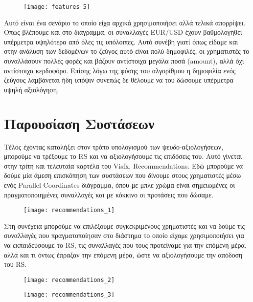 \begin{figure}[H]
  \centering
  \texttt{[image: features\_5]}
  \label{fig:features_5}
\end{figure}

Αυτό είναι ένα σενάριο το οποίο είχα αρχικά χρησιμοποιήσει αλλά τελικά απορρίψει. Όπως βλέπουμε και στο διάγραμμα, οι συναλλαγές EUR/USD έχουν βαθμολογηθεί υπέρμετρα υψηλότερα από όλες τις υπόλοιπες. Αυτό συνέβη γιατί όπως είδαμε και στην ανάλυση των δεδομένων το ζεύγος αυτό είναι πολύ δημοφιλές, οι χρηματιστές το συναλλάσουν πολλές φορές και βάζουν αντίστοιχα μεγάλα ποσά (amount), αλλά όχι αντίστοιχα κερδοφόρο. Επίσης λόγω της φύσης του αλγορίθμου η δημοφιλία ενός ζεύγους λαμβάνεται ήδη υπόψιν συνεπώς δε θέλουμε να του δώσουμε υπέρμετρα υψηλή αξιολόγηση.

\section{Παρουσίαση Συστάσεων}

Τέλος έχοντας καταλήξει στον τρόπο υπολογισμού των ψευδο-αξιολογήσεων, μπορούμε να τρέξουμε το RS και να αξιολογήσουμε τις επιδόσεις του. Αυτό γίνεται στην τρίτη και τελευταία καρτέλα του Visfx, Recommendations. Εδώ μπορούμε να δούμε μία άμεση επισκόπηση των συστάσεων που δίνουμε στους χρηματιστές μέσω ενός Parallel Coordinates διάγραμμα, όπου με μπλε χρώμα είναι σημειωμένες οι πραγματοποιημένες συναλλαγές και με κόκκινο οι προτάσεις που δώσαμε. 

\begin{figure}[H]
  \centering
  \texttt{[image: recommendations\_1]}
  \label{fig:recommendations_1}
\end{figure}

Στη συνέχεια μπορούμε να επιλέξουμε συγκεκριμένους χρηματιστές και να δούμε τις συναλλαγές που πραγματοποίησαν στο διάστημα το οποίο είχαμε χρησιμοποιήσει για να εκπαιδεύσουμε το RS, τις συναλλαγές που τους προτείναμε για την επόμενη μέρα, αλλά και τι όντως έπραξαν την επόμενη μέρα, ώστε να αξιολογήσουμε την απόδοση του RS.

\begin{figure}[H]
  \centering
  \texttt{[image: recommendations\_2]}
  \label{fig:recommendations_2}
\end{figure}

\begin{figure}[H]
  \centering
  \texttt{[image: recommendations\_3]}
  \label{fig:recommendations_3}
\end{figure}

